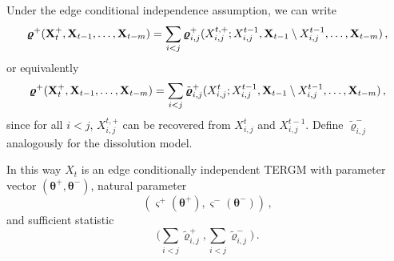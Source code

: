 \documentclass[12pt]{article}
\newcommand{\bvarrho}{\boldsymbol \varrho}
\newcommand{\btheta}{\boldsymbol \theta}
\newcommand{\0}{{\bf 0}}
\begin{document}
Under the edge conditional independence assumption, we can write
\begin{equation*} %
  \bvarrho^+({\bf X}^+_t, {\bf X}_{t-1}, \ldots, {\bf X}_{t-m}) = \sum_{i < j} \bvarrho_{i,j}^+(X_{i,j}^{t,+}; X_{i,j}^{t-1}, {\bf X}_{t-1} \setminus X_{i,j}^{t-1}, \ldots, {\bf X}_{t-m})\,,
\end{equation*}
or equivalently
\begin{equation*}
  \bvarrho^+({\bf X}^+_t, {\bf X}_{t-1}, \ldots, {\bf X}_{t-m}) = \sum_{i < j} \tilde{\bvarrho}_{i,j}^+(X_{i,j}^t; X_{i,j}^{t-1}, {\bf X}_{t-1} \setminus X_{i,j}^{t-1}, \ldots, {\bf X}_{t-m})\,,
\end{equation*}
since for all $i < j$, $X_{i,j}^{t,+}$ can be recovered from $X_{i,j}^t$ and $X_{i,j}^{t-1}$.
Define $\tilde{\bvarrho}^-_{i,j}$ analogously for the dissolution model.

In this way $X_t$ is an edge conditionally independent TERGM with parameter vector $(\btheta^+,\btheta^-)$, natural parameter
\begin{equation*}
  (\varsigma^+(\btheta^+),\varsigma^-(\btheta^-))\,,
\end{equation*}
and sufficient statistic
\begin{equation*}
  \bigg( \sum_{i < j} \tilde{\bvarrho}^+_{i,j}, \sum_{i < j} \tilde{\bvarrho}^-_{i,j} \bigg)\,.
\end{equation*}

\end{document}
